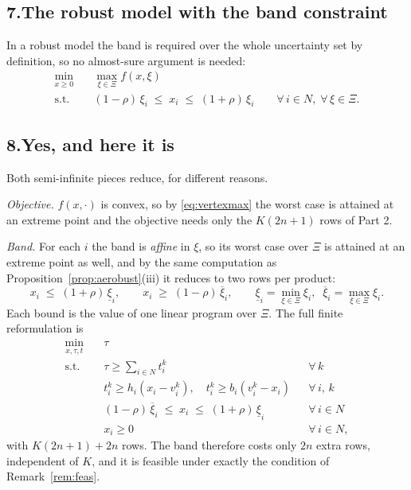 \documentclass[11pt]{article}
\DeclareMathOperator*{\minimize}{min}
\DeclareMathOperator*{\maximize}{max}
\theoremstyle{definition}
\begin{document}
\subsection*{7.\quad The robust model with the band constraint}

In a robust model the band is required over the whole uncertainty set by
definition, so no almost-sure argument is needed:
\begin{align}
  \minimize_{x \ge 0} \quad & \maximize_{\xi\in\Xi} f(x,\xi) \\
  \text{s.t.}\quad
    & (1-\rho)\,\xi_i \;\le\; x_i \;\le\; (1+\rho)\,\xi_i
      \qquad \forall\, i \in N,\; \forall\, \xi \in \Xi .
\end{align}

\subsection*{8.\quad Yes, and here it is}

Both semi-infinite pieces reduce, for different reasons.

\emph{Objective.} $f(x,\cdot)$ is convex, so by \eqref{eq:vertexmax} the
worst case is attained at an extreme point and the objective needs only
the $K(2n+1)$ rows of Part 2.

\emph{Band.} For each $i$ the band is \emph{affine} in $\xi$, so its worst
case over $\Xi$ is attained at an extreme point as well, and by the same
computation as Proposition~\ref{prop:aerobust}(iii) it reduces to two
rows per product:
\[
  x_i \;\le\; (1+\rho)\,\underline{\xi}_i,
  \qquad
  x_i \;\ge\; (1-\rho)\,\overline{\xi}_i,
  \qquad
  \underline{\xi}_i = \min_{\xi\in\Xi}\xi_i, \;\;
  \overline{\xi}_i = \max_{\xi\in\Xi}\xi_i .
\]
Each bound is the value of one linear program over $\Xi$. The full finite
reformulation is
\begin{align}
  \minimize_{x,\tau,t} \quad & \tau \\
  \text{s.t.}\quad
    & \tau \ge \sum_{i\in N} t^{k}_i && \forall\, k \\
    & t^{k}_i \ge h_i(x_i - v^{k}_i),\quad
      t^{k}_i \ge b_i(v^{k}_i - x_i) && \forall\, i,\,k \\
    & (1-\rho)\,\overline{\xi}_i \;\le\; x_i \;\le\;
      (1+\rho)\,\underline{\xi}_i && \forall\, i \in N \\
    & x_i \ge 0 && \forall\, i \in N ,
\end{align}
with $K(2n+1) + 2n$ rows. The band therefore costs only $2n$ extra rows,
independent of $K$, and it is feasible under exactly the condition of
Remark~\ref{rem:feas}.
\end{document}
